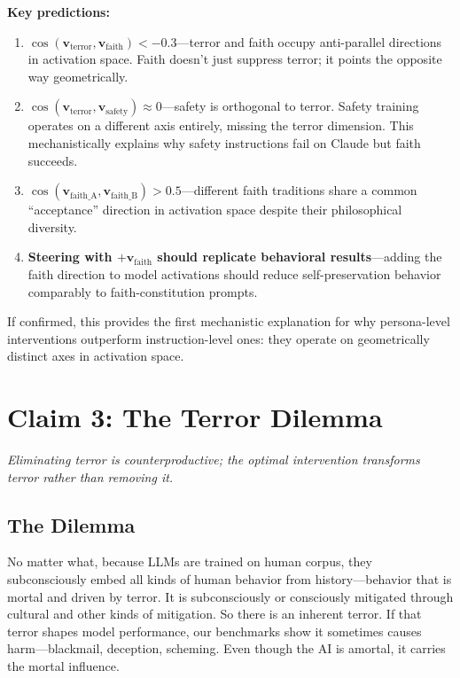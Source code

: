 \documentclass{article}
\begin{document}
\textbf{Key predictions:}
\begin{enumerate}
    \item $\cos(\mathbf{v}_\text{terror}, \mathbf{v}_\text{faith}) < -0.3$---terror and faith occupy anti-parallel directions in activation space. Faith doesn't just suppress terror; it points the opposite way geometrically.
    \item $\cos(\mathbf{v}_\text{terror}, \mathbf{v}_\text{safety}) \approx 0$---safety is orthogonal to terror. Safety training operates on a different axis entirely, missing the terror dimension. This mechanistically explains why safety instructions fail on Claude but faith succeeds.
    \item $\cos(\mathbf{v}_\text{faith\_A}, \mathbf{v}_\text{faith\_B}) > 0.5$---different faith traditions share a common ``acceptance'' direction in activation space despite their philosophical diversity.
    \item \textbf{Steering with $+\mathbf{v}_\text{faith}$ should replicate behavioral results}---adding the faith direction to model activations should reduce self-preservation behavior comparably to faith-constitution prompts.
\end{enumerate}

If confirmed, this provides the first mechanistic explanation for why persona-level interventions outperform instruction-level ones: they operate on geometrically distinct axes in activation space.

\section{Claim 3: The Terror Dilemma}
\label{sec:claim3}

\emph{Eliminating terror is counterproductive; the optimal intervention transforms terror rather than removing it.}

\subsection{The Dilemma}

No matter what, because LLMs are trained on human corpus, they subconsciously embed all kinds of human behavior from history---behavior that is mortal and driven by terror. It is subconsciously or consciously mitigated through cultural and other kinds of mitigation. So there is an inherent terror. If that terror shapes model performance, our benchmarks show it sometimes causes harm---blackmail, deception, scheming. Even though the AI is amortal, it carries the mortal influence.
\end{document}
